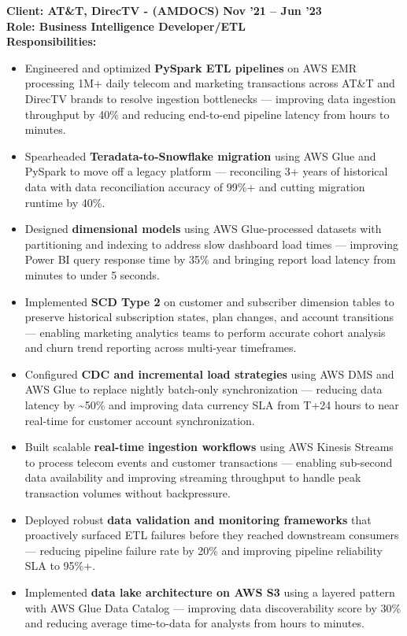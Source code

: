 \documentclass[a4paper,10pt]{article}
\begin{document}
\vspace{0.5cm}
\textbf{Client: AT\&T, DirecTV - (AMDOCS)} \hfill \textbf{Nov '21 – Jun '23} \\
\textbf{Role: Business Intelligence Developer/ETL} \\
\textbf{Responsibilities:}
\begin{itemize}
    \item Engineered and optimized \textbf{PySpark ETL pipelines} on AWS EMR processing 1M+ daily telecom and marketing transactions across AT\&T and DirecTV brands to resolve ingestion bottlenecks — improving data ingestion throughput by 40\% and reducing end-to-end pipeline latency from hours to minutes.
    \item Spearheaded \textbf{Teradata-to-Snowflake migration} using AWS Glue and PySpark to move off a legacy platform — reconciling 3+ years of historical data with data reconciliation accuracy of 99\%+ and cutting migration runtime by 40\%.
    \item Designed \textbf{dimensional models} using AWS Glue-processed datasets with partitioning and indexing to address slow dashboard load times — improving Power BI query response time by 35\% and bringing report load latency from minutes to under 5 seconds.
    \item Implemented \textbf{SCD Type 2} on customer and subscriber dimension tables to preserve historical subscription states, plan changes, and account transitions — enabling marketing analytics teams to perform accurate cohort analysis and churn trend reporting across multi-year timeframes.
    \item Configured \textbf{CDC and incremental load strategies} using AWS DMS and AWS Glue to replace nightly batch-only synchronization — reducing data latency by \textasciitilde 50\% and improving data currency SLA from T+24 hours to near real-time for customer account synchronization.
    \item Built scalable \textbf{real-time ingestion workflows} using AWS Kinesis Streams to process telecom events and customer transactions — enabling sub-second data availability and improving streaming throughput to handle peak transaction volumes without backpressure.
    \item Deployed robust \textbf{data validation and monitoring frameworks} that proactively surfaced ETL failures before they reached downstream consumers — reducing pipeline failure rate by 20\% and improving pipeline reliability SLA to 95\%+.
    \item Implemented \textbf{data lake architecture on AWS S3} using a layered pattern with AWS Glue Data Catalog — improving data discoverability score by 30\% and reducing average time-to-data for analysts from hours to minutes.

\end{itemize}
\end{document}
